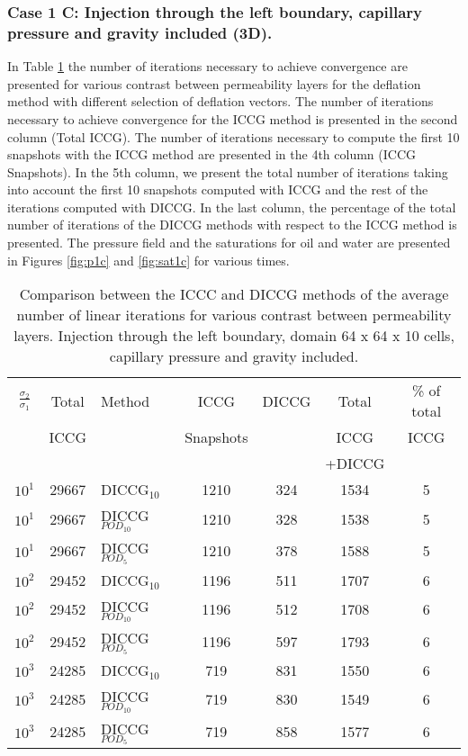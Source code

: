 \documentclass[12pt]{article}
\begin{document}
\subsubsection*{Case 1 C: Injection through the left boundary, capillary pressure and gravity included (3D).}
In Table \ref{table:liter1c} the number of iterations necessary to achieve convergence are presented for various contrast between permeability layers for the deflation method with different selection of deflation vectors. The number of iterations necessary to achieve convergence for the ICCG method is presented in the second column (Total ICCG). The number of iterations necessary to compute the first 10 snapshots with the ICCG method are presented in the 4th column (ICCG Snapshots). In the 5th column, we present the total number of iterations taking into account the first 10 snapshots computed with ICCG and the rest of the iterations computed with DICCG. In the last column, the percentage of the total number of iterations of the DICCG methods with respect to the ICCG method is presented.   
The pressure field and the saturations for oil and water are presented in Figures \ref{fig:p1c} and \ref{fig:sat1c} for various times.
\begin{table}[!h]\centering
\begin{minipage}{1\textwidth}
 \centering
\begin{tabular}{ ||c|c||l|c|c|c|c||} 
\hline
$\frac{\sigma_2}{\sigma_1}$&Total&Method  & ICCG&DICCG &Total&\% of total\\ 
                           & ICCG     &  & Snapshots& &ICCG& ICCG\\ 
                            &     &  & & &+DICCG& \\
\hline 
$10^{1}$ &29667& DICCG$_{10}$&1210&324&1534&5\\ 
\hline  
$10^{1}$ &29667& DICCG$_{POD_{10}}$&1210&328&1538&5 \\ 
\hline  
$10^{1}$ &29667& DICCG$_{POD_{5}}$&1210&378&1588&5 \\ 
\hline  
$10^{2}$ &29452& DICCG$_{10}$&1196&511&1707&6\\ 
\hline  
$10^{2}$ &29452& DICCG$_{POD_{10}}$&1196&512&1708&6 \\ 
\hline  
$10^{2}$ &29452& DICCG$_{POD_{5}}$&1196&597&1793&6 \\ 
\hline
$10^{3}$ &24285& DICCG$_{10}$&719&831&1550&6\\ 
\hline  
$10^{3}$ &24285& DICCG$_{POD_{10}}$&719&830&1549&6 \\ 
\hline  
$10^{3}$ &24285& DICCG$_{POD_{5}}$&719&858&1577&6 \\ 
\hline 
\end{tabular} 
\caption{Comparison between the ICCC and DICCG methods of the average number of linear iterations for various contrast between permeability layers. Injection through the left boundary, domain 64 x 64 x 10 cells, capillary pressure and gravity included.}\label{table:liter1c} 
\end{minipage}  
\end{table}  
\end{document}
